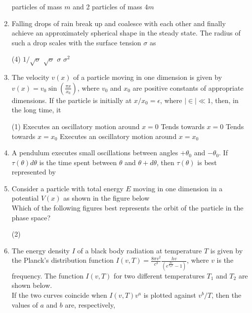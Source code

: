 \begin{enumerate}
\begin{tasks}
	 particles of mass $m$ and 2 particles of mass $4 m$	
\end{tasks}	
\item  Falling drops of rain break up and coalesce with each other and finally achieve an approximately spherical shape in the steady state. The radius of such a drop scales with the surface tension $\sigma$ as
	 \begin{tasks}(4)
		\task[\textbf{a.}]$1 / \sqrt{\sigma}$
		\task[\textbf{b.}] $\sqrt{\sigma}$
		\task[\textbf{c.}]$\sigma$
		\task[\textbf{d.}] $\sigma^{2}$
	\end{tasks}
\item  The velocity $v(x)$ of a particle moving in one dimension is given by $v(x)=v_{0} \sin \left(\frac{\pi x}{x_{0}}\right)$, where $v_{0}$ and $x_{0}$ are positive constants of appropriate dimensions. If the particle is initially at $x / x_{0}=\epsilon$, where $|\in| \ll 1$, then, in the long time, it
	 \begin{tasks}(1)
		\task[\textbf{a.}] Executes an oscillatory motion around $x=0$
		\task[\textbf{b.}]Tends towards $x=0$
		\task[\textbf{c.}] Tends towards $x=x_{0}$
		\task[\textbf{d.}] Executes an oscillatory motion around $x=x_{0}$
	\end{tasks}
\item  A pendulum executes small oscillations between angles $+\theta_{0}$ and $-\theta_{0}$. If $\tau(\theta) d \theta$ is the time spent between $\theta$ and $\theta+d \theta$, then $\tau(\theta)$ is best represented by
\item Consider a particle with total energy $E$ moving in one dimension in a potential $V(x)$ as shown in the figure below\\
Which of the following figures best represents the orbit of the particle in the phase space?
	 \begin{tasks}(2)
		\task[\textbf{a.}]
		\task[\textbf{b.}]
		\task[\textbf{c.}]
		\task[\textbf{d.}] 
	\end{tasks}
\item The energy density $I$ of a black body radiation at temperature $T$ is given by the Planck's distribution function $I(v, T)=\frac{8 \pi v^{2}}{c^{3}} \frac{h v}{\left(e^{\frac{h v}{k_{B} T}}-1\right)}$, where $v$ is the frequency. The function $I(v, T)$ for two different temperatures $T_{1}$ and $T_{2}$ are shown below.\\
 If the two curves coincide when $I(v, T) v^{a}$ is plotted against $v^{b} / T$, then the values of $a$ and $b$ are, respectively,

\end{enumerate}
